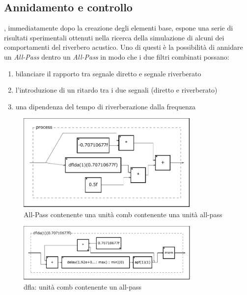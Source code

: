 \subsection{Annidamento e controllo}

\ms, immediatamente dopo la creazione degli elementi base, espone una serie di
risultati sperimentali ottenuti nella ricerca della simulazione di alcuni dei
comportamenti del riverbero acustico. Uno di questi è la possibilità di annidare
un \emph{All-Pass} dentro un \emph{All-Pass} in modo che i due filtri combinati
possano:
\begin{enumerate}
  \item bilanciare il rapporto tra segnale diretto e segnale riverberato
  \item l'introduzione di un ritardo tra i due segnali (diretto e riverberato)
  \item una dipendenza del tempo di riverberazione dalla frequenza
\end{enumerate}



\begin{figure}[htp]
\centering
\includegraphics[width=0.80\textwidth]{Code/msapfdwp-svg/process.pdf}
\caption{All-Pass contenente una unità comb contenente una unità all-pass}
\label{fig:apfdwp}
\end{figure}

\begin{figure}[htp]
\centering
\includegraphics[width=0.80\textwidth]{Code/msapfdwp-svg/dflda-0x600001c847e0.pdf}
\caption{dfla: unità comb contenente un all-pass}
\label{fig:dfla}
\end{figure}{}{}

